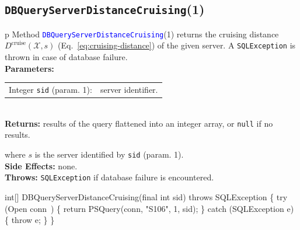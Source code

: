 \subsection{\texttt{DBQueryServerDistanceCruising}(1)}
\begin{tabular}{p{\textwidth}}
\toprule
{}
Method \textcolor{blue}{{\tt{}\protect{}DBQueryServerDistanceCruising}}(1) returns the
cruising distance $D^\textrm{cruise}(\mathcal{X},s)$
(Eq.~\ref{eq:cruising-distance}) of the given server.
A {\tt{}SQLException} is thrown in case of database failure.\\
\midrule
\textbf{Parameters:}\\
\begin{tabular}{lp{116mm}}
Integer {\tt{}sid} (param. 1):&server identifier.
\end{tabular}\\
\textbf{Returns:} results of the query flattened into an integer array,
or {\tt{}null} if no results.


where $s$ is the server identified by {\tt{}sid} (param. 1).\\
\textbf{Side Effects:} none.\\
\textbf{Throws:} {\tt{}SQLException} if database failure is encountered.\\
\bottomrule
\end{tabular}
\nwenddocs{}\endmoddef{}
int[] DBQueryServerDistanceCruising(final int sid) throws SQLException \{
  try (\LA{}Open \code{}conn\edoc{}~{\nwtagstyle{}}\RA{}) \{
    return PSQuery(conn, "S106", 1, sid);
  \} catch (SQLException e) \{
    throw e;
  \}
\}
\eatline
{}\nwendcode{}\nwdocspar
